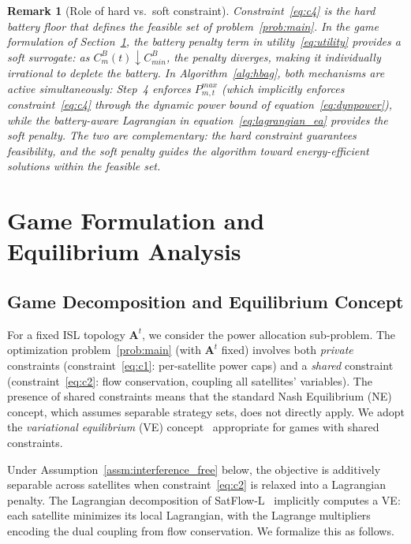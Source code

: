 \documentclass[journal]{IEEEtran}
\newtheorem{remark}{Remark}
\newcommand{\CB}{C^{B}}
\newcommand{\CBmin}{C^{B}_{min}}
\begin{document}
\begin{remark}[Role of hard vs.\ soft constraint]
\label{rem:hard_soft}
Constraint~\eqref{eq:c4} is the \emph{hard} battery floor that defines the feasible set of problem~\eqref{prob:main}. In the game formulation of Section~\ref{sec:game}, the battery penalty term in utility~\eqref{eq:utility} provides a \emph{soft} surrogate: as $\CB_m(t)\downarrow\CBmin$, the penalty diverges, making it individually irrational to deplete the battery. In Algorithm~\ref{alg:hbag}, both mechanisms are active simultaneously: Step~4 enforces $P_{m,t}^{max}$ (which implicitly enforces constraint~\eqref{eq:c4} through the dynamic power bound of equation~\eqref{eq:dynpower}), while the battery-aware Lagrangian in equation~\eqref{eq:lagrangian_ea} provides the soft penalty. The two are complementary: the hard constraint guarantees feasibility, and the soft penalty guides the algorithm toward energy-efficient solutions within the feasible set.
\end{remark}

\section{Game Formulation and Equilibrium Analysis}
\label{sec:game}

\subsection{Game Decomposition and Equilibrium Concept}

For a fixed ISL topology $\mathbf{A}^t$, we consider the power allocation sub-problem. The optimization problem~\eqref{prob:main} (with $\mathbf{A}^t$ fixed) involves both \emph{private} constraints (constraint~\eqref{eq:c1}: per-satellite power caps) and a \emph{shared} constraint (constraint~\eqref{eq:c2}: flow conservation, coupling all satellites' variables). The presence of shared constraints means that the standard Nash Equilibrium (NE) concept, which assumes separable strategy sets, does not directly apply. We adopt the \emph{variational equilibrium} (VE) concept~\cite{facchinei2007vi} appropriate for games with shared constraints.

Under Assumption~\ref{assm:interference_free} below, the objective is additively separable across satellites when constraint~\eqref{eq:c2} is relaxed into a Lagrangian penalty. The Lagrangian decomposition of SatFlow-L~\cite{cen2024satflow} implicitly computes a VE: each satellite minimizes its local Lagrangian, with the Lagrange multipliers encoding the dual coupling from flow conservation. We formalize this as follows.
\end{document}
